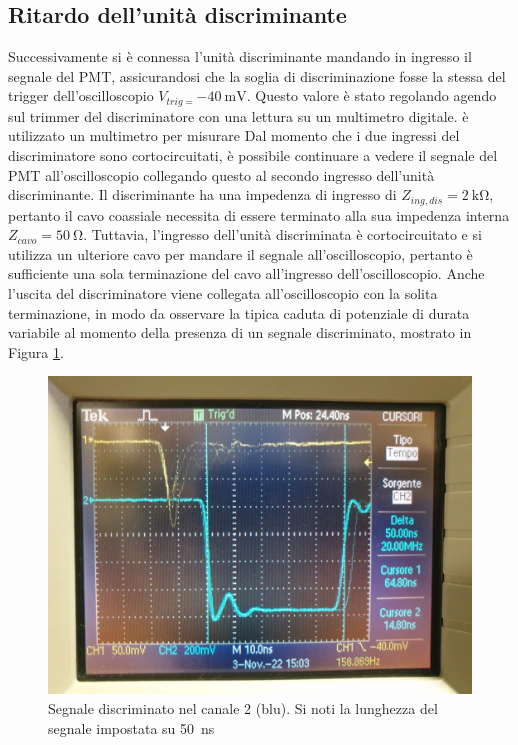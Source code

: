 \documentclass[10pt,a4paper]{article}
\begin{document}
\subsection{Ritardo dell'unità discriminante}\label{ritardo}
Successivamente si è connessa l'unità discriminante mandando in ingresso il segnale del PMT, assicurandosi che la soglia di discriminazione fosse la stessa del trigger dell'oscilloscopio $V_{trig=}\SI{-40}{\milli \volt}$. Questo valore è stato regolando agendo sul trimmer del discriminatore con una lettura su un multimetro digitale. è utilizzato un multimetro per misurare  Dal momento che i due ingressi del discriminatore sono cortocircuitati, è possibile continuare a vedere il segnale del PMT all'oscilloscopio collegando questo al secondo ingresso dell'unità discriminante. Il discriminante ha una impedenza di ingresso di $Z_{ing,dis}=\SI{2}{\kilo\ohm}$, pertanto il cavo coassiale necessita di essere terminato alla sua impedenza interna $Z_{cavo}=\SI{50}{\ohm}$. Tuttavia, l'ingresso dell'unità discriminata è cortocircuitato e si utilizza un ulteriore cavo per mandare il segnale all'oscilloscopio, pertanto è sufficiente una sola terminazione del cavo all'ingresso dell'oscilloscopio. Anche l'uscita del discriminatore viene collegata all'oscilloscopio con la solita terminazione, in modo da osservare la tipica caduta di potenziale di durata variabile al momento della presenza di un segnale discriminato, mostrato in Figura \ref{fig:discr}.

\begin{figure}[h]
    \centering
    \includegraphics[width=0.8\columnwidth]{img/discriminato.jpeg}
    \caption{Segnale discriminato nel canale 2 (blu). Si noti la lunghezza del segnale impostata su \SI{50}{\nano\second}}
    \label{fig:discr}
\end{figure}
\end{document}
